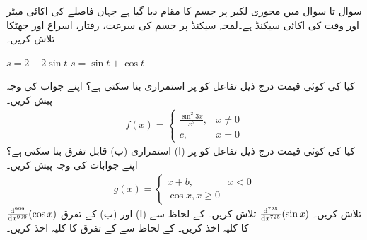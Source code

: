 سوال  تا سوال  میں محوری لکیر  پر  جسم کا مقام  دیا گیا ہے جہاں فاصلے کی اکائی میٹر اور وقت کی اکائی سیکنڈ ہے۔لمحہ  سیکنڈ پر جسم کی سرعت، رفتار، اسراع اور جھٹکا تلاش کریں۔


$s=2-2\sin t$
$s=\sin t+\cos t$

کیا  کی کوئی قیمت درج ذیل تفاعل کو  پر استمراری بنا سکتی ہے؟ اپنے جواب کی وجہ پیش کریں۔
\begin{align*}
f(x)=
\begin{cases}
\tfrac{\sin^2 3x}{x^2},&x\ne 0\\
c,&x=0
\end{cases}
\end{align*}
کیا  کی کوئی قیمت درج ذیل تفاعل کو  پر (ا) استمراری (ب) قابل تفرق  بنا سکتی ہے؟ اپنے جوابات کی وجہ پیش کریں۔ 
\begin{align*}
g(x)=
\begin{cases}
x+b,&x<0\\
\cos x,x\ge 0
\end{cases}
\end{align*}
$\tfrac{\dif^{\,999}}{\dif x^{999}}(\cos x)$
تلاش کریں۔
$\tfrac{\dif^{\,725}}{\dif x^{725}}(\sin x)$ 
تلاش کریں۔
 کے لحاظ سے (ا)  اور (ب)  کے تفرق کا کلیہ اخذ کریں۔
 کے لحاظ سے   کے تفرق کا کلیہ اخذ کریں۔

